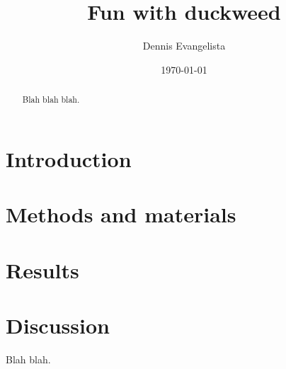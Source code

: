 \documentclass[reprint,aps,amsmath,amssymb]{revtex4-1}
\begin{document}
\title{Fun with duckweed}
\author{Dennis Evangelista}
\date{\today}

\begin{abstract}
Blah blah blah. 
\end{abstract}

\maketitle

\section{Introduction}
\section{Methods and materials}
\section{Results}
\section{Discussion}

\begin{acknowledgements}
Blah blah. 
\end{acknowledgements}



\end{document}
